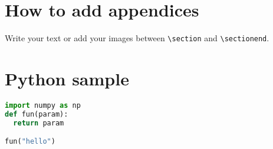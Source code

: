 \appendix

\section{How to add appendices}
Write your text or add your images between \verb:\section: and \verb:\sectionend:.

\sectionend


\section{Python sample}
\label{app:python}

 \lstset{style=customstyle}

\begin{lstlisting}[language=Python]
import numpy as np
def fun(param):
  return param

fun("hello")
\end{lstlisting}

\sectionend